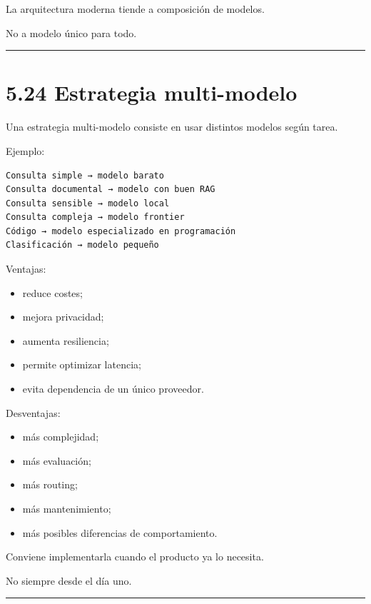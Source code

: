 La arquitectura moderna tiende a composición de modelos.

No a modelo único para todo.

\begin{center}\rule{0.5\linewidth}{0.5pt}\end{center}

\section{5.24 Estrategia multi-modelo}\label{estrategia-multi-modelo}

Una estrategia multi-modelo consiste en usar distintos modelos según
tarea.

Ejemplo:

\begin{lstlisting}
Consulta simple → modelo barato
Consulta documental → modelo con buen RAG
Consulta sensible → modelo local
Consulta compleja → modelo frontier
Código → modelo especializado en programación
Clasificación → modelo pequeño
\end{lstlisting}

Ventajas:

\begin{itemize}
\tightlist
\item
  reduce costes;
\item
  mejora privacidad;
\item
  aumenta resiliencia;
\item
  permite optimizar latencia;
\item
  evita dependencia de un único proveedor.
\end{itemize}

Desventajas:

\begin{itemize}
\tightlist
\item
  más complejidad;
\item
  más evaluación;
\item
  más routing;
\item
  más mantenimiento;
\item
  más posibles diferencias de comportamiento.
\end{itemize}

Conviene implementarla cuando el producto ya lo necesita.

No siempre desde el día uno.

\begin{center}\rule{0.5\linewidth}{0.5pt}\end{center}


